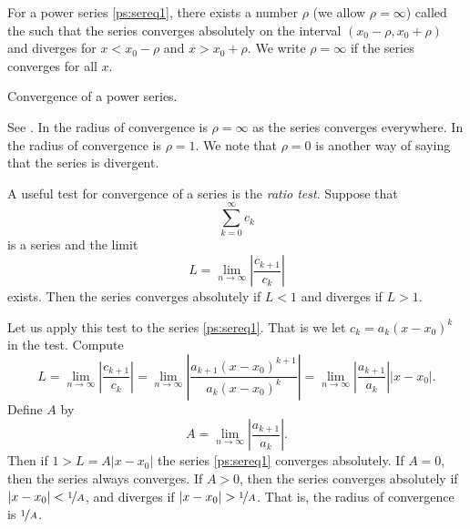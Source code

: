 \begin{theorem}
For a power series \eqref{ps:sereq1}, there exists a number
$\rho$ (we allow $\rho=\infty$)
called the \emph{} such that
the series converges absolutely on the interval
$(x_0-\rho,x_0+\rho)$ and diverges for $x < x_0-\rho$ and $x > x_0+\rho$.
We write $\rho=\infty$ if
the series converges for all $x$.
\end{theorem}

\begin{myfig}
\capstart
{}
\caption{Convergence of a power series.\label{ps:convfig}}
\end{myfig}

See .
In  the radius of convergence is $\rho = \infty$
as the series converges everywhere.  In 
the radius of convergence is $\rho=1$.
We note that $\rho = 0$ is another way of saying that the series is
divergent.

A useful test for convergence of a series is the
\emph{ratio test}.  Suppose that
\begin{equation*}
\sum_{k=0}^\infty c_k
\end{equation*}
is a series and the limit
\begin{equation*}
L = \lim_{n\to\infty} \left \lvert \frac{c_{k+1}}{c_k} \right \rvert
\end{equation*}
exists.  Then the series converges absolutely if $L < 1$ and diverges
if $L > 1$.

Let us apply this test to the series \eqref{ps:sereq1}.  That is
we let $c_k = a_k {(x - x_0)}^k$ in the test.  Compute
\begin{equation*}
L = \lim_{n\to\infty} \left \lvert \frac{c_{k+1}}{c_k} \right \rvert
=
\lim_{n\to\infty} \left \lvert
\frac{a_{k+1} {(x - x_0)}^{k+1}}{a_k {(x - x_0)}^k}
\right \rvert
=
\lim_{n\to\infty} \left \lvert
\frac{a_{k+1}}{a_k}
\right \rvert
\lvert  x - x_0 \rvert .
\end{equation*}
Define $A$ by
\begin{equation*}
A =
\lim_{n\to\infty} \left \lvert
\frac{a_{k+1}}{a_k}
\right \rvert .
\end{equation*}
Then if $1 > L = A \lvert x - x_0 \rvert$ the series \eqref{ps:sereq1}
converges absolutely.
If $A = 0$, then the series always converges.  If $A > 0$, then
the series converges absolutely
if $\lvert x - x_0 \rvert < \nicefrac{1}{A}$,
and diverges if $\lvert x - x_0 \rvert > \nicefrac{1}{A}$.  That is,
the radius of convergence is $\nicefrac{1}{A}$.

